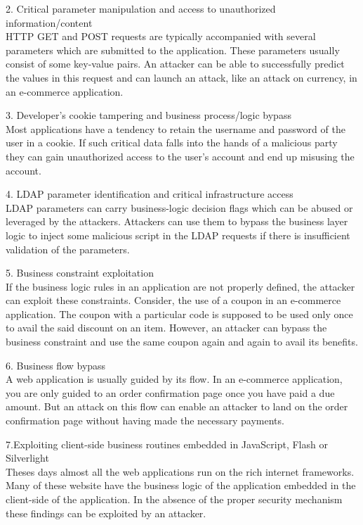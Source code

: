 \documentclass[11pt]{article}
\begin{document}
2. Critical parameter manipulation and access to unauthorized information/content\\
HTTP GET and POST requests are typically accompanied with several parameters which are submitted to the application. These parameters usually consist of some key-value pairs. An attacker can be able to successfully predict the values in this request and can launch an attack, like an attack on currency, in an e-commerce application.

3. Developer's cookie tampering and business process/logic bypass\\
Most applications have a tendency to retain the username and password of the user in a cookie. If such critical data falls into the hands of a malicious party they can gain unauthorized access to the user's account and end up misusing the account.

4. LDAP parameter identification and critical infrastructure access\\
LDAP parameters can carry business-logic decision flags which can be abused or leveraged by the attackers. Attackers can use them to bypass the business layer logic to inject some malicious script in the LDAP requests if there is insufficient validation of the parameters.

5. Business constraint exploitation\\
If the business logic rules in an application are not properly defined, the attacker can exploit these constraints. Consider, the use of a coupon in an e-commerce application. The coupon with a particular code is supposed to be used only once to avail the said discount on an item. However, an attacker can bypass the business constraint and use the same coupon again and again to avail its benefits.

6. Business flow bypass\\
A web application is usually guided by its flow. In an e-commerce application, you are only guided to an order confirmation page once you have paid a due amount. But an attack on this flow can enable an attacker to land on the order confirmation page without having made the necessary payments.

7.Exploiting client-side business routines embedded in JavaScript, Flash or Silverlight\\
Theses days almost all the web applications run on the rich internet frameworks. Many of these website have the business logic of the application embedded in the client-side of the application. In the absence of the proper security mechanism these findings can be exploited by an attacker.
\end{document}
